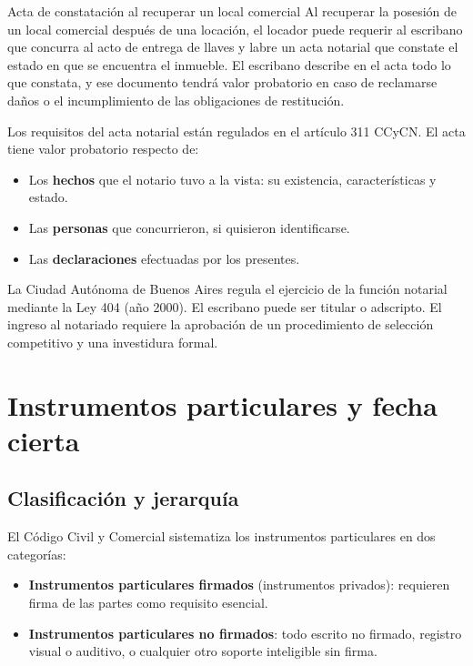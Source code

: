 \documentclass[12pt,oneside]{book}
\begin{document}
\begin{example}{Acta de constatación al recuperar un local comercial}
Al recuperar la posesión de un local comercial después de una locación, el locador puede requerir al escribano que concurra al acto de entrega de llaves y labre un acta notarial que constate el estado en que se encuentra el inmueble. El escribano describe en el acta todo lo que constata, y ese documento tendrá valor probatorio en caso de reclamarse daños o el incumplimiento de las obligaciones de restitución.
\end{example}

Los requisitos del acta notarial están regulados en el artículo 311 CCyCN. El acta tiene valor probatorio respecto de:

\begin{itemize}
    \item Los \textbf{hechos} que el notario tuvo a la vista: su existencia, características y estado.
    \item Las \textbf{personas} que concurrieron, si quisieron identificarse.
    \item Las \textbf{declaraciones} efectuadas por los presentes.
\end{itemize}

\begin{note}
La Ciudad Autónoma de Buenos Aires regula el ejercicio de la función notarial mediante la Ley 404 (año 2000). El escribano puede ser titular o adscripto. El ingreso al notariado requiere la aprobación de un procedimiento de selección competitivo y una investidura formal.
\end{note}

\chapter{Instrumentos particulares y fecha cierta}

\section{Clasificación y jerarquía}

El Código Civil y Comercial sistematiza los instrumentos particulares en dos categorías:

\begin{itemize}
    \item \textbf{Instrumentos particulares firmados} (instrumentos privados): requieren firma de las partes como requisito esencial.
    \item \textbf{Instrumentos particulares no firmados}: todo escrito no firmado, registro visual o auditivo, o cualquier otro soporte inteligible sin firma.
\end{itemize}
\end{document}
